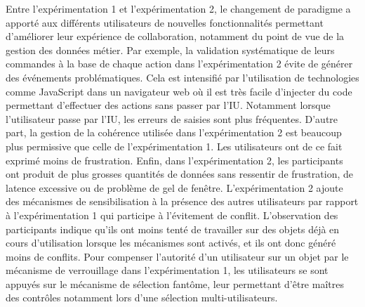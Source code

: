 Entre l'expérimentation 1 et l'expérimentation 2, le changement de paradigme a 
apporté aux différents utilisateurs de nouvelles fonctionnalités permettant d'améliorer leur 
expérience de collaboration, notamment du point de vue de la gestion des 
données métier. Par exemple, la validation systématique de leurs commandes à la 
base de chaque action dans l'expérimentation 2 évite de générer des événements 
problématiques. Cela est intensifié par l'utilisation de 
technologies comme JavaScript dans un navigateur web où il est très facile 
d'injecter du code permettant d'effectuer des actions sans passer par l'\gls{IU}. Notamment lorsque l'utilisateur passe par l'\gls{IU}, les erreurs de saisies sont plus
fréquentes. D'autre part, la gestion de la cohérence utilisée dans 
l'expérimentation 2 est beaucoup plus permissive que celle de l'expérimentation 1. 
Les utilisateurs ont de ce fait exprimé moins de frustration. Enfin, 
dans l'expérimentation 2, les participants ont produit de plus grosses quantités de 
données sans ressentir de frustration, de latence excessive ou de problème de 
gel de fenêtre.
L'expérimentation 2 ajoute des mécanismes de sensibilisation à la présence des 
autres utilisateurs par rapport à l'expérimentation 1 qui participe à l'évitement de conflit. L'observation des participants indique qu'ils ont moins tenté de travailler 
sur des objets déjà en cours d'utilisation lorsque les mécanismes sont activés, et ils ont donc généré moins de conflits. 
Pour compenser l'autorité d'un utilisateur sur un objet par le mécanisme de 
verrouillage dans l'expérimentation 1, les utilisateurs se sont appuyés 
sur le mécanisme de sélection fantôme, leur permettant d'être  maîtres des 
contrôles notamment lors d'une sélection multi-utilisateurs.